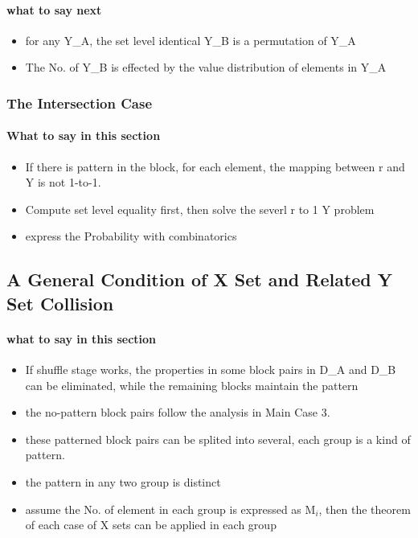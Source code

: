 \documentclass{article}
\begin{document}
\paragraph{what to say next}
\begin{itemize}
	\item for any Y\_A, the set level identical Y\_B is a permutation of Y\_A
	\item The No. of Y\_B is effected by the value distribution of elements in Y\_A
\end{itemize}



\subsubsection{The Intersection Case}
\paragraph{What to say in this section}
\begin{itemize}
	\item If there is pattern in the block, for each element, the mapping between r and Y is not 1-to-1.
	\item Compute set level equality first, then solve the severl r to 1 Y problem
	\item express the Probability with combinatorics
\end{itemize}

\subsection{A General Condition of X Set and Related Y Set Collision}
\paragraph{what to say in this section}
\begin{itemize}
	\item If shuffle stage works, the properties in some block pairs in D\_A and D\_B can be eliminated, while the remaining blocks maintain the pattern
	\item the no-pattern block pairs follow the analysis in Main Case 3.
	\item these patterned block pairs can be splited into several, each group is a kind of pattern.
	\item the pattern in any two group is distinct
	\item assume the No. of element in each group is expressed as M$_i$, then the theorem of each case of X sets can be applied in each group
\end{itemize}
\end{document}
